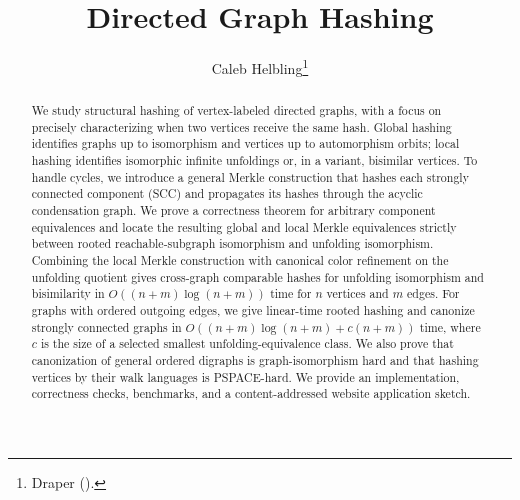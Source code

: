 \documentclass[twoside,leqno]{article}
\begin{document}
%
\newcommand\relatedversion{}

\title{\Large Directed Graph Hashing\relatedversion}
    \author{Caleb Helbling\thanks{Draper ().}}

\date{}

\maketitle




\begin{abstract}
We study structural hashing of vertex-labeled directed graphs, with a focus on precisely characterizing when two vertices receive the same hash. Global hashing identifies graphs up to isomorphism and vertices up to automorphism orbits; local hashing identifies isomorphic infinite unfoldings or, in a variant, bisimilar vertices. To handle cycles, we introduce a general Merkle construction that hashes each strongly connected component (SCC) and propagates its hashes through the acyclic condensation graph. We prove a correctness theorem for arbitrary component equivalences and locate the resulting global and local Merkle equivalences strictly between rooted reachable-subgraph isomorphism and unfolding isomorphism. Combining the local Merkle construction with canonical color refinement on the unfolding quotient gives cross-graph comparable hashes for unfolding isomorphism and bisimilarity in $O((n+m)\log(n+m))$ time for $n$ vertices and $m$ edges. For graphs with ordered outgoing edges, we give linear-time rooted hashing and canonize strongly connected graphs in $O((n+m)\log(n+m)+c(n+m))$ time, where $c$ is the size of a selected smallest unfolding-equivalence class. We also prove that canonization of general ordered digraphs is graph-isomorphism hard and that hashing vertices by their walk languages is PSPACE-hard. We provide an implementation, correctness checks, benchmarks, and a content-addressed website application sketch.
\end{abstract}
\end{document}
